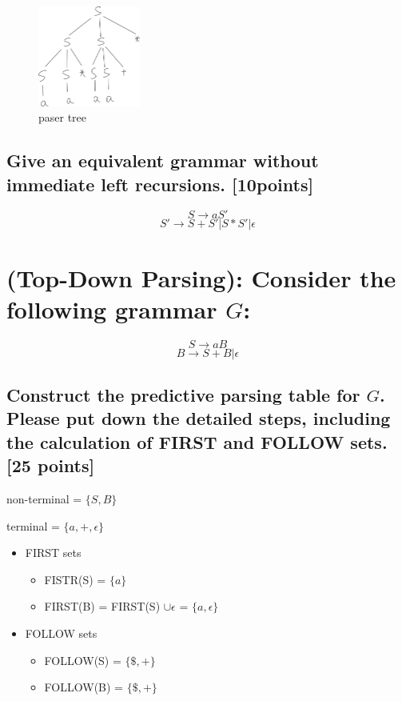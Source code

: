 \documentclass[onecolumn,oneside]{SUSTechHomework}
\begin{document}
  \begin{figure}[H]
    \centering
    \includegraphics[width=0.30\textwidth]{img/pic1.jpg}
    \caption{paser tree}
  \end{figure}

  \subsection{Give an equivalent grammar without immediate left recursions. [10points]}

  $$S \rightarrow aS'$$
  $$S' \rightarrow S+S' | S*S' | \epsilon$$

\newpage

\section{(Top-Down Parsing): Consider the following grammar $G$:}

  $$S \rightarrow aB$$
  $$B \rightarrow S + B | \epsilon$$

  \subsection{Construct the predictive parsing table for $G$. Please put down the detailed steps, including the calculation of FIRST and FOLLOW sets. [25 points]}

  non-terminal = $\{S, B\}$

  terminal = $\{a, +, \epsilon\}$

  \begin{itemize}
    \item FIRST sets
    \begin{itemize}
      \item FISTR(S) = $\{a\}$ 
      \item FIRST(B) = FIRST(S) $\cup \epsilon$ = $\{a, \epsilon\}$
    \end{itemize}
    \item FOLLOW sets
    \begin{itemize}
      \item FOLLOW(S) = $\{\$, +\}$
      \item FOLLOW(B) = $\{\$, +\}$
    \end{itemize}
  \end{itemize}
\end{document}
